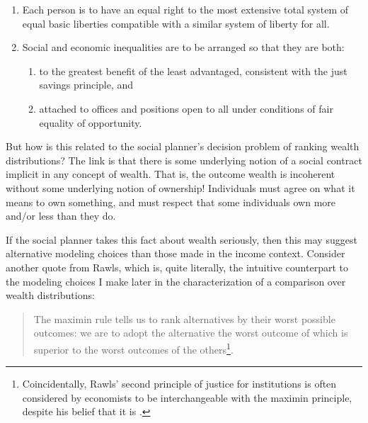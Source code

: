 \documentclass[\econtexRoot/IneqMeas]{subfiles}
\begin{document}
\begin{enumerate}
\item Each person is to have an equal right to the most extensive total system of equal basic liberties compatible with a similar system of liberty for all.

\item Social and economic inequalities are to be arranged so that they are both:

\begin{enumerate}
\item to the greatest benefit of the least advantaged, consistent with the just savings principle, and
\item attached to offices and positions open to all under conditions of fair equality of opportunity.
\end{enumerate}
\end{enumerate}

\par But how is this related to the social planner's decision problem of ranking wealth distributions? The link is that there is some underlying notion of a social contract implicit in any concept of wealth. That is, the outcome wealth is incoherent without some underlying notion of ownership! Individuals must agree on what it means to own something, and must respect that some individuals own more and/or less than they do.

\par If the social planner takes this fact about wealth seriously, then this may suggest alternative modeling choices than those made in the income context. Consider another quote from Rawls, which is, quite literally, the intuitive counterpart to the modeling choices I make later in the characterization of a comparison over wealth distributions:

\begin{quote}

The maximin rule tells us to rank alternatives by their worst possible outcomes: we are to adopt the alternative the worst outcome of which is superior to the worst outcomes of the others\footnote{Coincidentally, Rawls' second principle of justice for institutions is often considered by economists to be interchangeable with the maximin principle, despite his belief that it is .}.

\end{quote}



\onlyinsubfile{}

\end{document}
